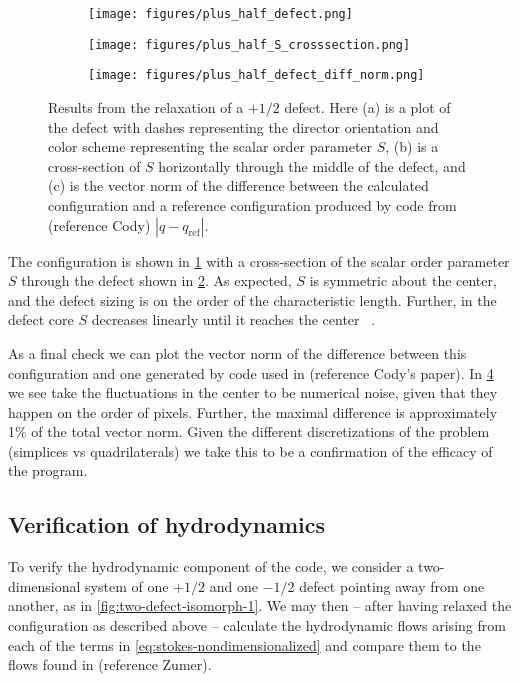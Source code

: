 \documentclass[reqno]{article}
\begin{document}
  \begin{figure}[h]
    \centering
    \begin{subfigure}{0.45\textwidth}
      \texttt{[image: figures/plus\_half\_defect.png]}
      \caption{}
      \label{fig:plus-half-defect}
    \end{subfigure}
    \hfill
    \begin{subfigure}{0.45\textwidth}
      \texttt{[image: figures/plus\_half\_S\_crosssection.png]}
      \caption{}
      \label{fig:plus-half-S-crosssection}
    \end{subfigure}
    \hfill
    \begin{subfigure}{0.45\textwidth}
      \texttt{[image: figures/plus\_half\_defect\_diff\_norm.png]}
      \caption{}
      \label{fig:plus-half-defect-diff-norm}
    \end{subfigure}
    \caption{Results from the relaxation of a $+1/2$ defect. Here (a) is a plot
      of the defect with dashes representing the director orientation and color
      scheme representing the scalar order parameter $S$, (b) is a cross-section
    of $S$ horizontally through the middle of the defect, and (c) is the vector
    norm of the difference between the calculated configuration and a reference
    configuration produced by code from (reference Cody) $|q - q_\text{ref}|$.}
  \end{figure}

  The configuration is shown in \ref{fig:plus-half-defect} with a cross-section of the
  scalar order parameter $S$ through the defect shown in \ref{fig:plus-half-S-crosssection}.
  As expected, $S$ is symmetric about the center, and the defect sizing is on
  the order of the characteristic length.
  Further, in the defect core $S$ decreases linearly until it reaches the
  center ~\cite{ronning_flow_2021}.
  
  As a final check we can plot the vector norm of the difference between
  this configuration and one generated by code used in (reference Cody's paper).
  In \ref{fig:plus-half-defect-diff-norm} we see take the fluctuations in the center to be
  numerical noise, given that they happen on the order of pixels.
  Further, the maximal difference is approximately 1\% of the total vector norm.
  Given the different discretizations of the problem (simplices vs
  quadrilaterals) we take this to be a confirmation of the efficacy of the program.
  
  \subsection{Verification of hydrodynamics}
  To verify the hydrodynamic component of the code, we consider a
  two-dimensional system of one
  $+1/2$ and one $-1/2$ defect pointing away from one another, as in
  \ref{fig:two-defect-isomorph-1}.
  We may then -- after having relaxed the configuration as described above --
  calculate the hydrodynamic flows arising from each of the terms in
  \eqref{eq:stokes-nondimensionalized} and compare them to the flows found in
  (reference Zumer).
  
\end{document}
